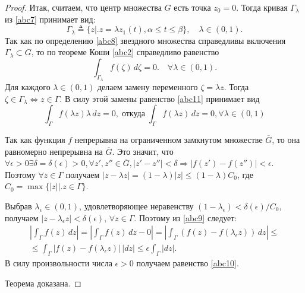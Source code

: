 \begin{proof}
Итак, считаем, что центр множества $G$ есть точка $z_0 =0$. Тогда
кривая $\Gamma_\lambda$ из \eqref{abc7} принимает вид:
$$
\Gamma_\lambda \triangleq \{ z \bigr|\bigl. z = \lambda z_1(t), \alpha \le t \le \beta\},\quad\lambda \in (0,1).
$$
Так как по определению \ref{abc8} звездного множества справедливы включения $\Gamma_\lambda \subset G$, то по теореме Коши \ref{abc2}  справедливо равенство
\begin{equation}
\label{abc11}
\int_{\Gamma_\lambda} f(\zeta)\,d\zeta = 0.\quad \forall \lambda \in (0,1).
\end{equation}
Для каждого $\lambda \in (0,1)$ делаем замену переменного $\zeta = \lambda z$. Тогда $\zeta \in \Gamma_\lambda \Leftrightarrow z \in \Gamma$. В силу этой замены равенство \eqref{abc11}  принимает вид
\begin{equation}
\label{abc9}
\int_{\Gamma} f(\lambda z)\lambda\,dz = 0, \; \text{откуда} \; \int_{\Gamma} f(\lambda z)\,dz = 0, \forall \lambda \in (0,1)
\end{equation}

Так как функция $f$ непрерывна на ограниченном замкнутом множестве $\overline{G}$, то она равномерно непрерывна на $\overline{G}$. Это значит, что $\forall \epsilon > 0 \exists \delta = \delta (\epsilon) > 0, \forall z',z'' \in \overline{G}, |z'-z''|<\delta \Rightarrow |f(z')-f(z'')| < \epsilon$.  Поэтому $\forall z \in \Gamma$ получаем $|z-\lambda z|=(1-\lambda)|z| \le (1-\lambda)C_0$, где $C_0=\max\{|z|\bigr|\bigl. z\in \Gamma\}$.

Выбрав $\lambda_\epsilon \in (0, 1)$, удовлетворяющее неравенству $(1 - \lambda_\epsilon) < \delta(\epsilon)/C_0 $, получаем $|z - \lambda_\epsilon z| < \delta(\epsilon),\, \forall z \in \Gamma$. Поэтому из \eqref{abc9} следует:
\begin{multline}
\left|\int_{\Gamma} f(z) \,dz \right| = \left|\int_{\Gamma} f(z) \,dz - 0 \right| = \left|\int_{\Gamma} (f(z) - f(\lambda_\epsilon z))\,dz \right| \le \\
\le \int_{\Gamma} |f(z) - f(\lambda_\epsilon z)|\,|dz| \le \epsilon \int_{\Gamma} |dz|.
\end{multline}
В силу произвольности числа $\epsilon > 0$ получаем равенство \eqref{abc10}.

Теорема доказана.
\end{proof}

